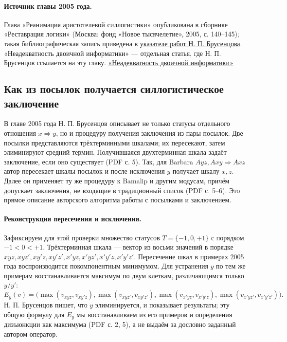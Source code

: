 \documentclass[12pt,a4paper]{article}
\begin{document}
\paragraph{Источник главы 2005 года.} Глава «Реанимация аристотелевой силлогистики» опубликована в сборнике «Реставрация логики» (Москва: фонд «Новое тысячелетие», 2005, с. 140–145); такая библиографическая запись приведена в \href{https://ternarycomp.cs.msu.ru/Brusentsov/Brusentsov_v2.html}{указателе работ Н. П. Брусенцова}. «Неадекватность двоичной информатики» — отдельная статья, где Н. П. Брусенцов ссылается на эту главу. \href{https://www.trinitas.ru/rus/doc/0226/002a/02260078.htm}{«Неадекватность двоичной информатики»}

\subsection{Как из посылок получается силлогистическое заключение}

В главе 2005 года Н. П. Брусенцов описывает не только статусы отдельного отношения \(x\Rightarrow y\), но и процедуру получения заключения из пары посылок. Две посылки представляются трёхтерминными шкалами; их пересекают, затем элиминируют средний термин. Получившаяся двухтерминная шкала задаёт заключение, если оно существует (PDF с. 5). Так, для Barbara \(Ayz, Axy\Rightarrow Axz\) автор пересекает шкалы посылок и после исключения \(y\) получает шкалу \(x,z\). Далее он применяет ту же процедуру к Bamalip и другим модусам, причём допускает заключения, не входящие в традиционный список (PDF с. 5–6). Это прямое описание авторского алгоритма работы с посылками и заключением.

\paragraph{Реконструкция пересечения и исключения.} Зафиксируем для этой проверки множество статусов \(T=\{-1,0,+1\}\) с порядком \(-1<0<+1\). Трёхтерминная шкала — вектор из восьми значений в порядке \(xyz,xyz',xy'z,xy'z',x'yz,x'yz',x'y'z,x'y'z'\). Пересечение шкал в примерах 2005 года воспроизводится покомпонентным минимумом. Для устранения \(y\) по тем же примерам восстанавливается максимум по двум клеткам, различающимся только \(y/y'\):
\[
E_y(v)=\bigl(\max(v_{xyz},v_{xy'z}),\max(v_{xyz'},v_{xy'z'}),
\max(v_{x'yz},v_{x'y'z}),\max(v_{x'yz'},v_{x'y'z'})\bigr).
\]
Н. П. Брусенцов пишет, что \(y\) элиминируется, и показывает результаты; эту общую формулу для \(E_y\) мы восстанавливаем из его примеров и определения дизъюнкции как максимума (PDF с. 2, 5), а не выдаём за дословно заданный автором оператор.
\end{document}
